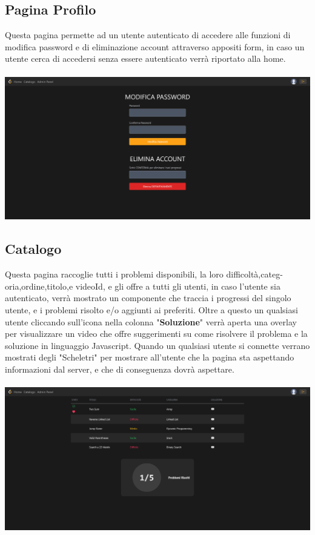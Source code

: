 \documentclass[11pt, a4paper]{article}
\theoremstyle{definition}
\begin{document}
\subsection{Pagina Profilo}
Questa pagina permette ad un utente autenticato di accedere alle funzioni di modifica password e di eliminazione account attraverso appositi form, in caso un utente cerca di accedersi senza essere autenticato verrà riportato alla home.\\\\
\includegraphics[width=\textwidth]{materiale/sito/Pagina Profilo.png}
\newpage
\subsection{Catalogo}
Questa pagina raccoglie tutti i problemi disponibili, la loro difficoltà,categ-\\
oria,ordine,titolo,e videoId, e gli offre a tutti gli utenti, in caso l'utente sia autenticato, verrà mostrato un componente
 che traccia i progressi del singolo utente, e i problemi risolto e/o aggiunti ai preferiti. Oltre a questo un qualsiasi
utente cliccando sull'icona nella colonna "\textbf{Soluzione}" verrà aperta una overlay per visualizzare un video che offre suggerimenti su come risolvere il problema e la soluzione in linguaggio Javascript.
Quando un qualsiasi utente si connette verrano mostrati degli "Scheletri" per mostrare all'utente che la pagina sta aspettando informazioni dal server, e che di conseguenza dovrà aspettare.\\\\
\includegraphics[width=\textwidth]{materiale/sito/Catalogo.png}
\newpage
\end{document}
